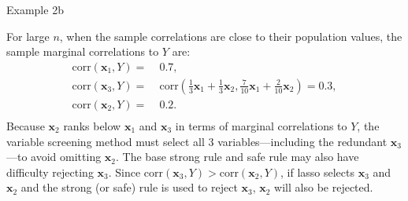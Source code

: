 \documentclass{beamer}
\begin{document}
\begin{frame}{Example 2b}
  
  For large $n$, when the sample correlations are close to their population values, the sample marginal correlations to $Y$ are:
  \begin{equation}
    \begin{aligned}
      \mathrm{corr} \left( \mathbf{x}_1, Y \right)  = & \;0.7, \\
      \mathrm{corr} \left( \mathbf{x}_3, Y \right)  = & \;\mathrm{corr} \left( \frac{1}{3} \mathbf{x}_1 + \frac{1}{3} \mathbf{x}_2, \frac{7}{10} \mathbf{x}_1 +  \frac{2}{10} \mathbf{x}_2 \right)
      = 0.3, \\
      \mathrm{corr} \left( \mathbf{x}_2, Y \right)  = & \;0.2. \\
    \end{aligned}
  \end{equation}
  Because $\mathbf{x}_2$ ranks below $\mathbf{x}_1$ and $\mathbf{x}_3$ in terms of marginal correlations to $Y$, the variable screening method must select all $3$ variables---including the redundant $\mathbf{x}_3$---to avoid omitting $\mathbf{x}_2$. The base strong rule and safe rule may also have difficulty rejecting $\mathbf{x}_3$. Since $\mathrm{corr} \left( \mathbf{x}_3, Y \right)>\mathrm{corr} \left( \mathbf{x}_2, Y \right)$, if lasso selects $\mathbf{x}_3$ and $\mathbf{x}_2$ and the strong (or safe) rule is used to reject $\mathbf{x}_3$, $\mathbf{x}_2$ will also be rejected.
\end{frame}
\end{document}
